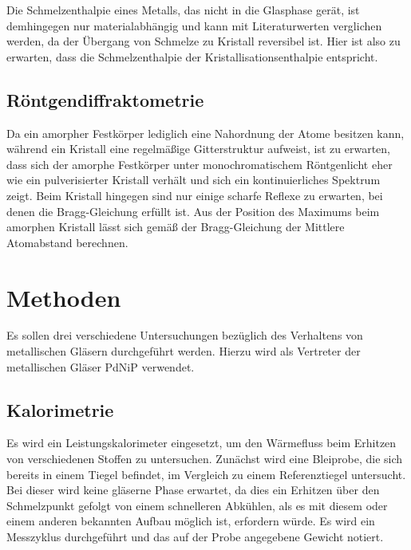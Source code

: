 \documentclass[
	a4paper,
	12pt,
	pagesize,
	ngerman
]{scrartcl}
\begin{document}
	Die Schmelzenthalpie eines Metalls, das nicht in die Glasphase gerät, ist demhingegen nur materialabhängig und kann mit Literaturwerten verglichen werden, da der Übergang von Schmelze zu Kristall reversibel ist.
	Hier ist also zu erwarten, dass die Schmelzenthalpie der Kristallisationsenthalpie entspricht.

	\subsection{Röntgendiffraktometrie}
	Da ein amorpher Festkörper lediglich eine Nahordnung der Atome besitzen kann, während ein Kristall eine regelmäßige Gitterstruktur aufweist, ist zu erwarten, dass sich der amorphe Festkörper unter monochromatischem Röntgenlicht eher wie ein pulverisierter Kristall verhält und sich ein kontinuierliches Spektrum zeigt.
	Beim Kristall hingegen sind nur einige scharfe Reflexe zu erwarten, bei denen die Bragg-Gleichung erfüllt ist.
	Aus der Position des Maximums beim amorphen Kristall lässt sich gemäß der Bragg-Gleichung der Mittlere Atomabstand berechnen.



	\section{Methoden} %
	Es sollen drei verschiedene Untersuchungen bezüglich des Verhaltens von metallischen Gläsern durchgeführt werden.
	Hierzu wird als Vertreter der metallischen Gläser PdNiP verwendet.

	\subsection{Kalorimetrie}
	Es wird ein Leistungskalorimeter eingesetzt, um den Wärmefluss beim Erhitzen von verschiedenen Stoffen zu untersuchen.
	Zunächst wird eine Bleiprobe, die sich bereits in einem Tiegel befindet, im Vergleich zu einem Referenztiegel untersucht.
	Bei dieser wird keine gläserne Phase erwartet, da dies ein Erhitzen über den Schmelzpunkt gefolgt von einem schnelleren Abkühlen, als es mit diesem oder einem anderen bekannten Aufbau möglich ist, erfordern würde.
	Es wird ein Messzyklus durchgeführt und das auf der Probe angegebene Gewicht notiert.
\end{document}

